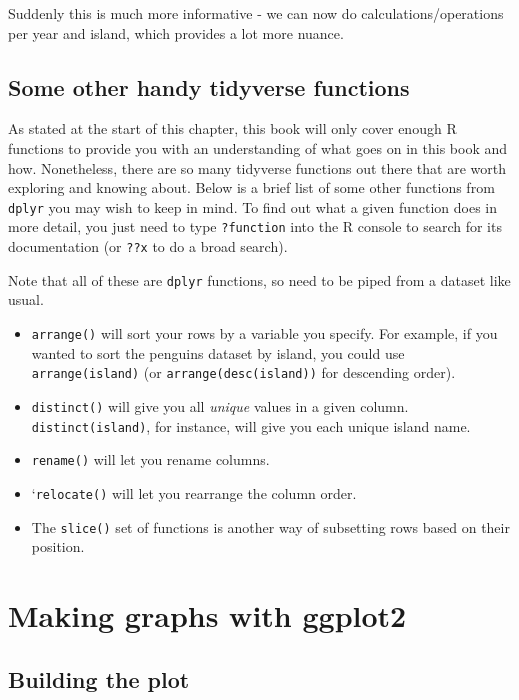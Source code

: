 \documentclass[
]{book}
\providecommand{\tightlist}{%
  \setlength{\itemsep}{0pt}\setlength{\parskip}{0pt}}
\begin{document}
Suddenly this is much more informative - we can now do calculations/operations per year and island, which provides a lot more nuance.

\hypertarget{some-other-handy-tidyverse-functions}{%
\subsection{Some other handy tidyverse functions}\label{some-other-handy-tidyverse-functions}}

As stated at the start of this chapter, this book will only cover enough R functions to provide you with an understanding of what goes on in this book and how. Nonetheless, there are so many tidyverse functions out there that are worth exploring and knowing about. Below is a brief list of some other functions from \texttt{dplyr} you may wish to keep in mind. To find out what a given function does in more detail, you just need to type \texttt{?function} into the R console to search for its documentation (or \texttt{??x} to do a broad search).

Note that all of these are \texttt{dplyr} functions, so need to be piped from a dataset like usual.

\begin{itemize}
\tightlist
\item
  \texttt{arrange()} will sort your rows by a variable you specify. For example, if you wanted to sort the penguins dataset by island, you could use \texttt{arrange(island)} (or \texttt{arrange(desc(island))} for descending order).
\item
  \texttt{distinct()} will give you all \emph{unique} values in a given column. \texttt{distinct(island)}, for instance, will give you each unique island name.
\item
  \texttt{rename()} will let you rename columns.
\item
  `\texttt{relocate()} will let you rearrange the column order.
\item
  The \texttt{slice()} set of functions is another way of subsetting rows based on their position.
\end{itemize}

\hypertarget{ggplot}{%
\section{Making graphs with ggplot2}\label{ggplot}}

\hypertarget{building-the-plot}{%
\subsection{Building the plot}\label{building-the-plot}}
\end{document}
